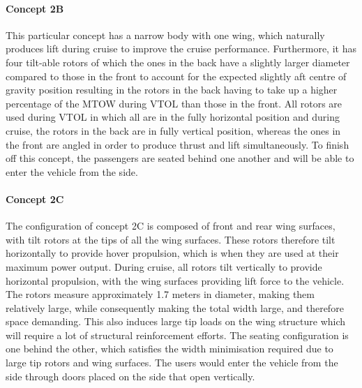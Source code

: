 \paragraph{Concept 2B}
This particular concept has a narrow body with one wing, which naturally produces lift during cruise to improve the cruise performance. Furthermore, it has four tilt-able rotors of which the ones in the back have a slightly larger diameter compared to those in the front to account for the expected slightly aft centre of gravity position resulting in the rotors in the back having to take up a higher percentage of the MTOW during VTOL than those in the front. All rotors are used during VTOL in which all are in the fully horizontal position and during cruise, the rotors in the back are in fully vertical position, whereas the ones in the front are angled in order to produce thrust and lift simultaneously. To finish off this concept, the passengers are seated behind one another and will be able to enter the vehicle from the side.

\paragraph{Concept 2C}
The configuration of concept 2C is composed of front and rear wing surfaces, with tilt rotors at the tips of all the wing surfaces. These rotors therefore tilt horizontally to provide hover propulsion, which is when they are used at their maximum power output. During cruise, all rotors tilt vertically to provide horizontal propulsion, with the wing surfaces providing lift force to the vehicle. The rotors measure approximately 1.7 meters in diameter, making them relatively large, while consequently making the total width large, and therefore space demanding. This also induces large tip loads on the wing structure which will require a lot of structural reinforcement efforts. The seating configuration is one behind the other, which satisfies the width minimisation required due to large tip rotors and wing surfaces. The users would enter the vehicle from the side through doors placed on the side that open vertically.  

